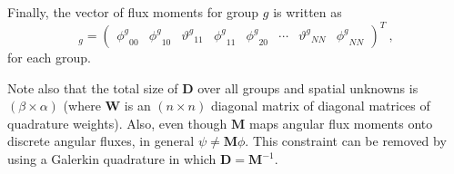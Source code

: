 \documentclass[12pt]{article}
\newcommand{\ve}[1]{\ensuremath{\mathbf{#1}}}
\newcommand{\even}{\ensuremath{\phi^g}}
\newcommand{\odd}{\ensuremath{\vartheta^g}}
\begin{document}
Finally, the vector of flux moments for group $g$ is written as
%
\begin{equation} 
[\phi]_g = \begin{pmatrix} \even_{00} & \even_{10} & \odd_{11}
& \even_{11} & \even_{20} & \cdots & \odd_{NN} & \even_{NN}
  \end{pmatrix}^T\:,
\end{equation} for each group.

Note also that the total size of $\ve{D}$ over all
groups and spatial unknowns is $(\beta \times \alpha)$ (where $\ve{W}$ is an $(n\times n)$ diagonal matrix of diagonal matrices of quadrature
weights).  Also, even though $\ve{M}$ maps
angular flux moments onto discrete angular fluxes, in general
$\psi\ne\ve{M}\phi$.  This constraint can be removed by using a Galerkin
quadrature in which $\ve{D} = \ve{M}^{-1}$.
\end{document}

